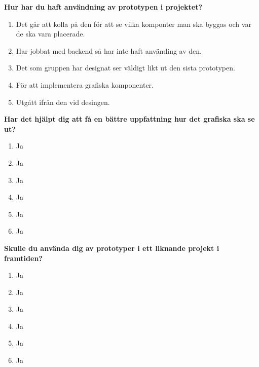  	\textbf{Hur har du haft användning av prototypen i projektet?} 
 	\begin{enumerate}
	\item Det går att kolla på den för att se vilka komponter man ska byggas och var de ska vara placerade.
	\item Har jobbat med backend så har inte haft använding av den. 
	\item Det som gruppen har designat ser väldigt likt ut den sista prototypen.
	\item För att implementera grafiska komponenter.  
	\item Utgått ifrån den vid desingen.

 	\end{enumerate}

 	\textbf{Har det hjälpt dig att få en bättre uppfattning hur det grafiska ska se ut?} 
 	
 	\begin{enumerate}
 	\item Ja
	\item Ja 
	\item Ja 
	\item Ja 
	\item Ja   
	\item Ja 

 	\end{enumerate}

 	\textbf{Skulle du använda dig av prototyper i ett liknande projekt i framtiden? } 
 	\begin{enumerate}
 	\item Ja
	\item Ja 
	\item Ja 
	\item Ja 
	\item Ja   
	\item Ja 
 	\end{enumerate}
 